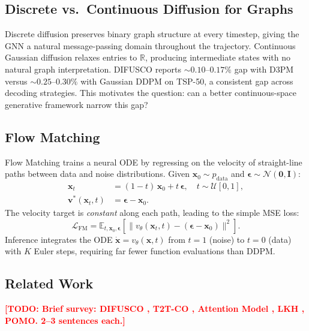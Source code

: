 \documentclass[11pt,a4paper]{article}
\newcommand{\TODO}[1]{\textcolor{red}{\textbf{[TODO: #1]}}}
\begin{document}
\subsection{Discrete vs.\ Continuous Diffusion for Graphs}
\label{sec:disc_vs_cont}
Discrete diffusion preserves binary graph structure at every timestep, giving the GNN
a natural message-passing domain throughout the trajectory. Continuous Gaussian diffusion
relaxes entries to $\mathbb{R}$, producing intermediate states with no natural graph
interpretation. DIFUSCO reports $\sim\!0.10$--$0.17\%$ gap with D3PM versus
$\sim\!0.25$--$0.30\%$ with Gaussian DDPM on TSP-50, a consistent gap across decoding
strategies. This motivates the question: can a better continuous-space generative framework
narrow this gap?

\subsection{Flow Matching}
\label{sec:fm_background}
Flow Matching \citep{lipman2022flow} trains a neural ODE by regressing on the velocity of
straight-line paths between data and noise distributions. Given
$\mathbf{x}_0 \sim p_\text{data}$ and $\boldsymbol\epsilon \sim \mathcal{N}(\mathbf{0},\mathbf{I})$:
\begin{align}
  \mathbf{x}_t &= (1-t)\,\mathbf{x}_0 + t\,\boldsymbol\epsilon,
    \quad t\sim\mathcal{U}[0,1], \label{eq:fm_interp} \\
  \mathbf{v}^*(\mathbf{x}_t, t) &= \boldsymbol\epsilon - \mathbf{x}_0. \label{eq:fm_vtarget}
\end{align}
The velocity target is \emph{constant} along each path, leading to the simple MSE loss:
\begin{equation}
  \mathcal{L}_\text{FM}
  = \mathbb{E}_{t,\mathbf{x}_0,\boldsymbol\epsilon}
    \left[\|v_\theta(\mathbf{x}_t,t) - (\boldsymbol\epsilon - \mathbf{x}_0)\|^2\right].
  \label{eq:fm_loss}
\end{equation}
Inference integrates the ODE $\dot{\mathbf{x}} = v_\theta(\mathbf{x},t)$ from $t=1$
(noise) to $t=0$ (data) with $K$ Euler steps, requiring far fewer function evaluations
than DDPM.

\subsection{Related Work}
\TODO{Brief survey: DIFUSCO \citep{sun2023difusco}, T2T-CO \citep{chen2024t2tco},
Attention Model \citep{kool2019attention}, LKH \citep{helsgott2000lkh}, POMO.
2--3 sentences each.}
\end{document}

